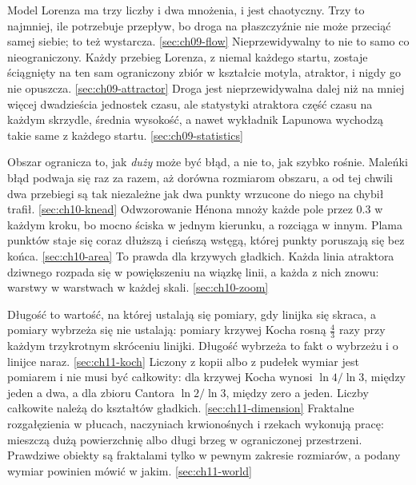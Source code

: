 %
  {Model Lorenza ma trzy liczby i dwa mnożenia, i jest chaotyczny. Trzy to najmniej, ile potrzebuje przepływ, bo droga na płaszczyźnie nie może przeciąć samej siebie; to też wystarcza.}%
  {\ref{sec:ch09-flow}}
%
  {Nieprzewidywalny to nie to samo co nieograniczony. Każdy przebieg Lorenza, z niemal każdego startu, zostaje ściągnięty na ten sam ograniczony zbiór w kształcie motyla, atraktor, i nigdy go nie opuszcza.}%
  {\ref{sec:ch09-attractor}}
%
  {Droga jest nieprzewidywalna dalej niż na mniej więcej dwadzieścia jednostek czasu, ale statystyki atraktora \dash{} część czasu na każdym skrzydle, średnia wysokość, a nawet wykładnik Lapunowa \dash{} wychodzą takie same z każdego startu.}%
  {\ref{sec:ch09-statistics}}

%
  {Obszar ogranicza to, jak \emph{duży} może być błąd, a nie to, jak szybko rośnie. Maleńki błąd podwaja się raz za razem, aż dorówna rozmiarom obszaru, a od tej chwili dwa przebiegi są tak niezależne jak dwa punkty wrzucone do niego na chybił trafił.}%
  {\ref{sec:ch10-knead}}
%
  {Odwzorowanie Hénona mnoży każde pole przez \num{0.3} w każdym kroku, bo mocno ściska w jednym kierunku, a rozciąga w innym. Plama punktów staje się coraz dłuższą i cieńszą wstęgą, której punkty poruszają się bez końca.}%
  {\ref{sec:ch10-area}}
%
  {To prawda dla krzywych gładkich. Każda linia atraktora dziwnego rozpada się w powiększeniu na wiązkę linii, a każda z nich znowu: warstwy w warstwach w każdej skali.}%
  {\ref{sec:ch10-zoom}}

%
  {Długość to wartość, na której ustalają się pomiary, gdy linijka się skraca, a pomiary wybrzeża się nie ustalają: pomiary krzywej Kocha rosną $\tfrac{4}{3}$ razy przy każdym trzykrotnym skróceniu linijki. Długość wybrzeża to fakt o wybrzeżu i o linijce naraz.}%
  {\ref{sec:ch11-koch}}
%
  {Liczony z kopii albo z pudełek wymiar jest pomiarem i nie musi być całkowity: dla krzywej Kocha wynosi $\ln 4 / \ln 3$, między jeden a dwa, a dla zbioru Cantora $\ln 2 / \ln 3$, między zero a jeden. Liczby całkowite należą do kształtów gładkich.}%
  {\ref{sec:ch11-dimension}}
%
  {Fraktalne rozgałęzienia w płucach, naczyniach krwionośnych i rzekach wykonują pracę: mieszczą dużą powierzchnię albo długi brzeg w ograniczonej przestrzeni. Prawdziwe obiekty są fraktalami tylko w pewnym zakresie rozmiarów, a podany wymiar powinien mówić w jakim.}%
  {\ref{sec:ch11-world}}

